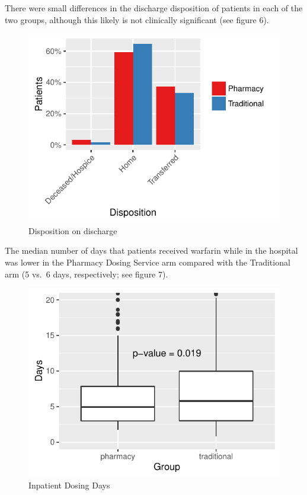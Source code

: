 \documentclass[]{article}
\begin{document}
There were small differences in the discharge disposition of patients in
each of the two groups, although this likely is not clinically
significant (see figure 6).

\begin{figure}[H]
\centering
\includegraphics{warfarin_analysis_2015_files/figure-latex/disposition-1.pdf}
\caption{Disposition on discharge}
\end{figure}

The median number of days that patients received warfarin while in the
hospital was lower in the Pharmacy Dosing Service arm compared with the
Traditional arm (5 vs.~6 days, respectively; see figure 7).

\begin{figure}[H]
\centering
\includegraphics{warfarin_analysis_2015_files/figure-latex/dosing_days-1.pdf}
\caption{Inpatient Dosing Days}
\end{figure}
\end{document}

